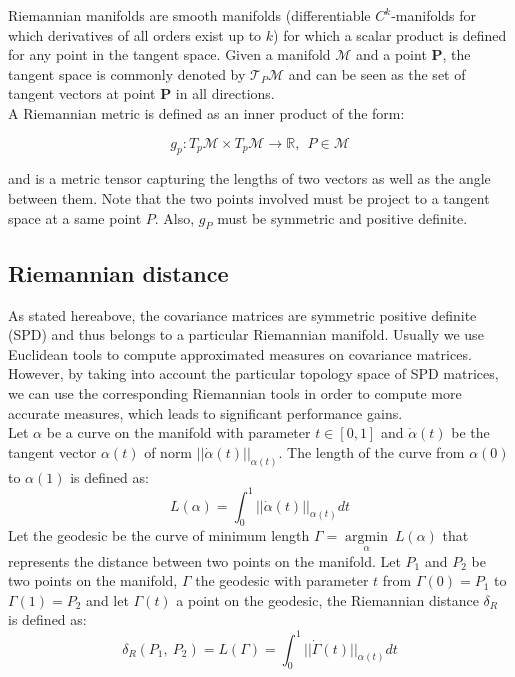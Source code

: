 \documentclass[a4paper,11pt]{report}
\begin{document}
Riemannian manifolds are smooth manifolds (differentiable $C^k$-manifolds for which derivatives of all orders exist up to $k$)
for which a scalar product is defined for any point in the tangent space. Given a manifold $\mathcal{M}$ and a point $\textbf{P}$,
the tangent space is commonly denoted by $\mathcal{T}_P \mathcal{M}$ and can be seen as the set of tangent vectors at point $\textbf{P}$ in all directions.\\
A Riemannian metric is defined as an inner product of the form:

\begin{equation}
    g_p: T_p \mathcal{M} \times T_p \mathcal{M} \rightarrow \mathbb{R}, \ \ P \in \mathcal{M}
\end{equation}

and is a metric tensor capturing the lengths of two vectors as well as the angle between them. Note that the two
points involved must be project to a tangent space at a same point $P$. Also, $g_P$ must be symmetric and positive definite.

\subsection{Riemannian distance}

As stated hereabove, the covariance matrices are symmetric positive definite (SPD) and thus belongs to a particular Riemannian manifold. Usually we use Euclidean tools to compute approximated measures on covariance matrices. However, by taking into account the particular topology space of SPD matrices, we can use the corresponding Riemannian tools in order to compute more accurate measures, which leads to significant performance gains.\\

Let $\alpha$ be a curve on the manifold with parameter $t \in [0, 1]$ and $\dot{\alpha}(t)$ be the tangent vector $\alpha (t)$ of norm $||\dot{\alpha}(t)||_{\alpha (t)}$. The length of the curve from $\alpha (0)$ to $\alpha (1)$ is defined as:
$$L(\alpha) = \int_{0}^{1} ||\dot{\alpha}(t)||_{\alpha (t)} dt$$
Let the geodesic be the curve of minimum length $\Gamma = \mathop{\mathrm{argmin}}\limits_{\alpha}\ L(\alpha)$ that represents the distance between two points on the manifold.
Let $P_1$ and $P_2$ be two points on the manifold, $\Gamma$ the geodesic with parameter $t$ from $\Gamma(0) = P_1$ to $\Gamma(1) = P_2$ and let $\Gamma(t)$ a point on the geodesic, the Riemannian distance $\delta_R$ is defined as:
$$\delta_R (P_1,\ P_2) = L(\Gamma) = \int_{0}^{1} ||\dot{\Gamma}(t)||_{\alpha (t)} dt$$
\end{document}
